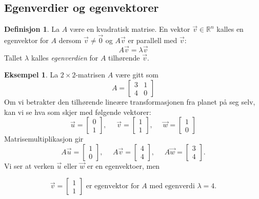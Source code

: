 \documentclass[11pt]{article}
\theoremstyle{definition}
\newtheorem{mindef}{Definisjon}[section]
\newenvironment{fmindef}
{\begin{mdframed}[style=minstil]\begin{mindef}}
		{\end{mindef}\end{mdframed}}
\theoremstyle{definition}
\newtheorem{mitteks}{Eksempel}[section]
\newenvironment{fmitteks}
{\begin{mdframed}[style=minstil]\begin{mitteks}}
		{\end{mitteks}\end{mdframed}}
\theoremstyle{definition}
\theoremstyle{definition}
\theoremstyle{definition}
\theoremstyle{definition}
\begin{document}
		
		\newpage
		
		\subsection{Egenverdier og egenvektorer}
		
		\begin{fmindef}
		La \(A\) være en kvadratisk matrise. En vektor \(\vec{v}\in \mathbb{R}^n\) kalles en egenvektor for \(A\) dersom \(\vec{v}\neq \vec{0} \) og \(A\vec{v}\) er parallell med \(\vec{v} \):
		\[A\vec{v}=\lambda\vec{v} \]
		Tallet \(\lambda \) kalles \textit{egenverdien} for \(A\) tilhørende \(\vec{v} \).
		\end{fmindef}
		
		\begin{fmitteks}
		La \(2\times 2 \)-matrisen \(A\) være gitt som 
		\[A=\left[\begin{array}{rr} 
		3 & 1 \\
		4 & 0
		\end{array} \right]\]
		Om vi betrakter den tilhørende lineære transformasjonen fra planet på seg selv, kan vi se hva som skjer
		med følgende vektorer:
		\[\vec{u}=\left[\begin{array}{rr} 
		0 \\
		1
		\end{array} \right]
		,\hspace{16pt}
		\vec{v}=\left[\begin{array}{rr} 
		1 \\
		1
		\end{array} \right]
		,\hspace{16pt}
		\vec{w}=\left[\begin{array}{rr} 
		1 \\
		0
		\end{array} \right]
		 \]
		Matrisemultiplikasjon gir
		\[A\vec{u}=\left[\begin{array}{rr} 
		1 \\
		0
		\end{array} \right]
		,\hspace{16pt}
		A\vec{v}=\left[\begin{array}{rr} 
		4 \\
		4
		\end{array} \right]
		,\hspace{16pt}
		A\vec{w}=\left[\begin{array}{rr} 
		3 \\
		4
		\end{array} \right].
		\]
		Vi ser at verken \(\vec{u}\) eller \(\vec{w} \) er en egenvektoer, men
		
		\[
		\vec{v}=\left[\begin{array}{rr} 
		1 \\
		1
		\end{array} \right]  \text{ er egenvektor for } A \text{ med egenverdi } \lambda=4.\]
		\end{fmitteks}
		
\end{document}
